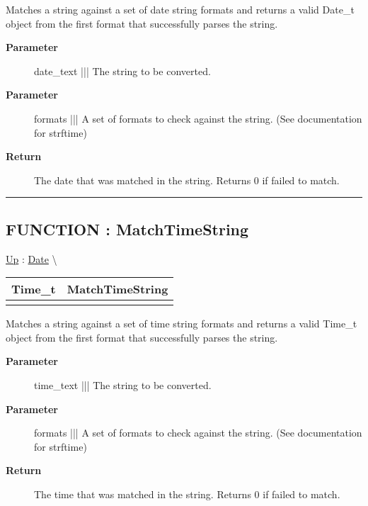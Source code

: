 \par
Matches a string against a set of date string formats and returns a valid Date\_t object from the first format that successfully parses the string.

\par
\begin{description}
\item [\textbf{Parameter}] date\_text ||| The string to be converted.
\item [\textbf{Parameter}] formats ||| A set of formats to check against the string. (See documentation for strftime)
\item [\textbf{Return}] The date that was matched in the string. Returns 0 if failed to match.
\end{description}

\rule{\linewidth}{0.5pt}
\subsection*{FUNCTION : MatchTimeString}
\hypertarget{ecldoc:date.matchtimestring}{}
\hyperlink{ecldoc:Date}{Up} :
\hspace{0pt} \hyperlink{ecldoc:Date}{Date} \textbackslash 

{\renewcommand{\arraystretch}{1.5}
\begin{tabularx}{\textwidth}{|>{\raggedright\arraybackslash}l|X|}
\hline
\hspace{0pt}Time\_t & MatchTimeString \\
\hline
\multicolumn{2}{|>{\raggedright\arraybackslash}X|}{\hspace{0pt}(STRING time\_text, SET OF VARSTRING formats)} \\
\hline
\end{tabularx}
}

\par
Matches a string against a set of time string formats and returns a valid Time\_t object from the first format that successfully parses the string.

\par
\begin{description}
\item [\textbf{Parameter}] time\_text ||| The string to be converted.
\item [\textbf{Parameter}] formats ||| A set of formats to check against the string. (See documentation for strftime)
\item [\textbf{Return}] The time that was matched in the string. Returns 0 if failed to match.
\end{description}

